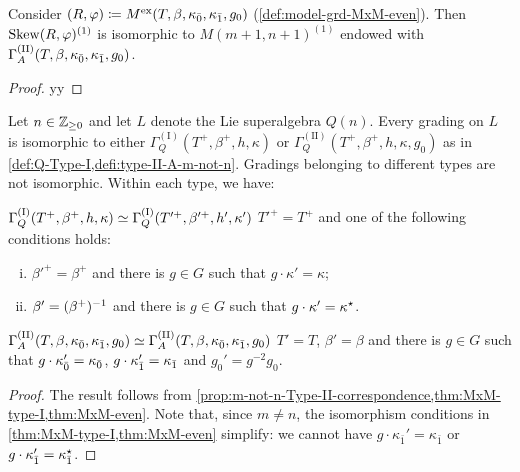 
\begin{prop}\label{prop:Q-Type-II-correspondence}
    Consider $(R, \varphi) \coloneqq M^{\mathrm{ex}}(T, \beta, \kappa_{\bar{0}}, \kappa_{\bar{1}}, g_0)$ (\cref{def:model-grd-MxM-even}). 
    Then $\operatorname{Skew} (R,\varphi)^{(1)}$ is isomorphic to $M(m+1, n+1)^{(1)}$ endowed with $\Gamma_A^{\mathrm{(II)}}(T, \beta, \kappa_{\bar{0}}, \kappa_{\bar{1}}, g_0)$. 
\end{prop}

\begin{proof}
    yy
\end{proof}


\begin{thm}\label{thm:final-Q(n)}
    Let $n \in \mathbb{Z}_{\geq 0}$ and 
    let $L$ denote the Lie superalgebra $Q(n)$. 
    Every grading on $L$ is isomorphic to either $\Gamma_Q^{\mathrm{(I)}}(T^+, \beta^+, h, \kappa)$ or $\Gamma_Q^{\mathrm{(II)}}(T^+, \beta^+, h, \kappa, g_0)$ as in \cref{def:Q-Type-I,defi:type-II-A-m-not-n}. 
    Gradings belonging to different types are not isomorphic. 
    Within each type, we have:
    
    \noindent{}
    
    \noindent $\Gamma_Q^{\mathrm{(I)}}(T^+, \beta^+, h, \kappa) \simeq \Gamma_Q^{\mathrm{(I)}}(T'^+, \beta'^+, h', \kappa')$ \IFF  $T'^+ = T^+$ and one of the following conditions holds:
	\begin{enumerate}[(i)]
	    \item $\beta'^+ = \beta^+$ and there is $g\in G$ such that $g \cdot \kappa'=\kappa$; 
	    \item $\beta'= (\beta^+)^{-1}$ and there is $g\in G$ such that $g \cdot \kappa'= \kappa^\star$.
	\end{enumerate}

    \noindent{}
    
    \noindent $\Gamma_A^{\mathrm{(II)}}(T,\beta, \kappa_{\bar{0}}, \kappa_{\bar{1}}, g_0) \simeq \Gamma_A^{\mathrm{(II)}}(T,\beta, \kappa_{\bar{0}}, \kappa_{\bar{1}}, g_0)$ \IFF
    $T' =T$, $\beta' = \beta$ and there is $g \in G$ such that $g\cdot\kappa_{\bar{0}}' = \kappa_{\bar{0}}$, $g\cdot\kappa_{\bar{1}}' = \kappa_{\bar{1}}$ and $g_0' = g^{-2}g_0$.
\end{thm}

\begin{proof}
    The result follows from \cref{prop:m-not-n-Type-II-correspondence,thm:MxM-type-I,thm:MxM-even}. 
    Note that, since $m \neq n$, the isomorphism conditions in \cref{thm:MxM-type-I,thm:MxM-even} simplify: we cannot have $g \cdot \kappa_{\bar 1}'=\kappa_{\bar 1}$ or $g \cdot \kappa_{\bar 1}'=\kappa_{\bar 1}^\star$. 
\end{proof}


